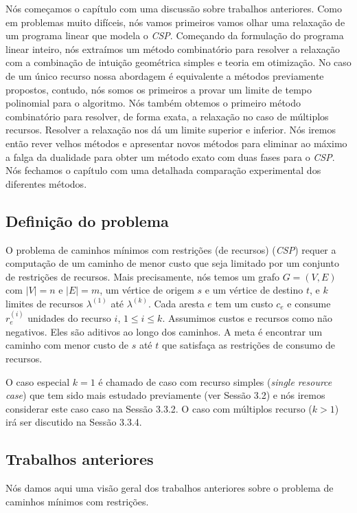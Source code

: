 \documentclass[10pt,a4paper]{article}
\begin{document}
Nós começamos o capítulo com uma discussão sobre trabalhos anteriores.  
Como em problemas muito difíceis, nós vamos primeiros vamos olhar uma 
relaxação de um programa linear que modela o \emph{CSP}. Começando da 
formulação do programa linear inteiro, nós extraímos um método 
combinatório para resolver a relaxação com a combinação de intuição 
geométrica simples e teoria em otimização. No caso de um único recurso 
nossa abordagem é equivalente a métodos previamente propostos, contudo, 
nós somos os primeiros a provar um limite de tempo polinomial para o 
algoritmo. Nós também obtemos o primeiro método combinatório para 
resolver, de forma exata, a relaxação no caso de múltiplos recursos.  
Resolver a relaxação nos dá um limite superior e inferior. Nós iremos 
então rever velhos métodos e apresentar novos métodos para eliminar ao 
máximo a falga da dualidade para obter um método exato com duas fases 
para o \emph{CSP}. Nós fechamos o capítulo com uma detalhada comparação 
experimental dos diferentes métodos.

\subsection{Definição do problema}

O problema de caminhos mínimos com restrições (de recursos) (\emph{CSP}) 
requer a computação de um caminho de menor custo que seja limitado por 
um conjunto de restrições de recursos. Mais precisamente, nós temos um 
grafo $G=(V,E)$ com $|V|=n$ e $|E|=m$, um vértice de origem $s$ e um 
vértice de destino $t$, e $k$ limites de recursos $\lambda^{(1)}$ até 
$\lambda^{(k)}$. Cada aresta $e$ tem um custo $c_e$ e consume 
$r^{(i)}_e$ unidades do recurso $i$, $1 \le i \le k$. Assumimos custos e 
recursos como não negativos. Eles são aditivos ao longo dos caminhos. A 
meta é encontrar um caminho com menor custo de $s$ até $t$ que satisfaça 
as restrições de consumo de recursos.

O caso especial $k=1$ é chamado de caso com recurso simples 
(\emph{single resource case}) que tem sido mais estudado previamente 
(ver Sessão 3.2) e nós iremos considerar este caso caso na Sessão 3.3.2.  
O caso com múltiplos recurso ($k>1$) irá ser discutido na Sessão 3.3.4.

\subsection{Trabalhos anteriores}


Nós damos aqui uma visão geral dos trabalhos anteriores sobre o problema 
de caminhos mínimos com restrições.
\end{document}
